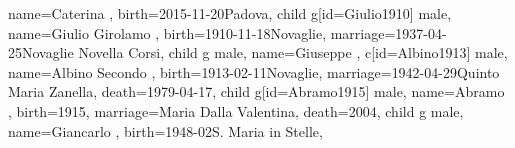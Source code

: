\documentclass{article}
\begin{document}
\begin{midpage}
\begin{center}
\begin{genealogypicture}
{{{{{{{{{{{{{{                                                        name={Caterina },
                                                        birth={2015-11-20}{Padova},
                                                    }
                                                }
                                            }
                                        }
                                        child{
                                            g[id=Giulio1910]{
                                                male,
                                                name={Giulio Girolamo },
                                                birth={1910-11-18}{Novaglie},
                                                marriage={1937-04-25}{Novaglie \newline Novella Corsi},
                                            }
                                            child{
                                                g{
                                                    male,
                                                    name={Giuseppe },
                                                }
                                            }
                                        }
                                        c[id=Albino1913]{
                                            male,
                                            name={Albino Secondo },
                                            birth={1913-02-11}{Novaglie},
                                            marriage={1942-04-29}{Quinto \newline Maria Zanella},
                                            death={1979-04-17}{},
                                        }
                                        child{
                                            g[id=Abramo1915]{
                                                male,
                                                name={Abramo },
                                                birth={1915}{},
                                                marriage={Maria Dalla Valentina}{},
                                                death={2004}{},
                                            }
                                            child{
                                                g{
                                                    male,
                                                    name={Giancarlo },
                                                    birth={1948-02}{S. Maria in Stelle},
}}}}}}}}}}}}}
\end{genealogypicture}
\end{center}
\end{midpage}
\end{document}
